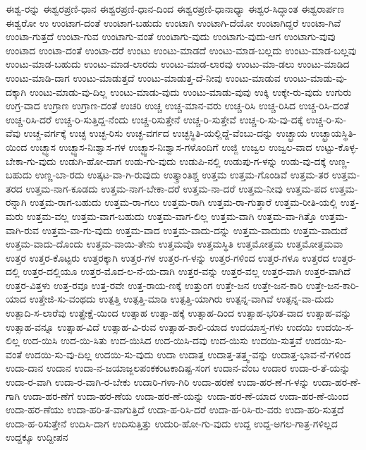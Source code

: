 {ಈಶ್ವ-ರನ್ನು
ಈಶ್ವರಪ್ರಣಿ-ಧಾನ
ಈಶ್ವರಪ್ರಣಿ-ಧಾನ-ದಿಂದ
ಈಶ್ವರಪ್ರಣಿ-ಧಾನಾಧ್ಯಾ
ಈಶ್ವರ-ಸಿದ್ಧಾಂತ
ಈಶ್ವರಾರ್ಪಣ
ಈಶ್ವರೋ
ಉ
ಉಂಟಾಗ-ದಂತೆ
ಉಂಟಾಗ-ಬಹುದು
ಉಂಟಾಗಿ
ಉಂಟಾಗಿ-ದೆಯೋ
ಉಂಟಾಗಿದ್ದರೆ
ಉಂಟಾ-ಗಿವೆ
ಉಂಟಾ-ಗುತ್ತದೆ
ಉಂಟಾ-ಗುವ
ಉಂಟಾಗು-ವಂತೆ
ಉಂಟಾಗು-ವುದು
ಉಂಟಾಗು-ವುದು-ಆಗ
ಉಂಟಾಗು-ವುವು
ಉಂಟಾದ
ಉಂಟಾ-ದಂತೆ
ಉಂಟಾ-ದರೆ
ಉಂಟು
ಉಂಟು-ಮಾಡದೆ
ಉಂಟು-ಮಾಡ-ಬಲ್ಲದು
ಉಂಟು-ಮಾಡ-ಬಲ್ಲವು
ಉಂಟು-ಮಾಡ-ಬಹುದು
ಉಂಟು-ಮಾಡ-ಲಾರದು
ಉಂಟು-ಮಾಡ-ಲಾರವು
ಉಂಟು-ಮಾ-ಡಲು
ಉಂಟು-ಮಾಡಿದ
ಉಂಟು-ಮಾಡಿ-ದಾಗ
ಉಂಟು-ಮಾಡುತ್ತದೆ
ಉಂಟು-ಮಾಡುತ್ತ-ದೆ-ನೀವು
ಉಂಟು-ಮಾಡುವ
ಉಂಟು-ಮಾಡು-ವು-ದಕ್ಕಾಗಿ
ಉಂಟು-ಮಾಡು-ವು-ದಿಲ್ಲ
ಉಂಟು-ಮಾಡು-ವುದು
ಉಂಟು-ಮಾಡು-ವುವು
ಉಕ್ಕಿ
ಉಕ್ಕೇ-ರು-ವುದು
ಉಗುರು
ಉಗ್ರ-ವಾದ
ಉಗ್ರಾಣ
ಉಗ್ರಾಣ-ದಂತೆ
ಉಚರಿ
ಉಚ್ಚ
ಉಚ್ಚ-ಮಾನ-ವರು
ಉಚ್ಚ-ರಿಸಿ
ಉಚ್ಚ-ರಿಸಿದ
ಉಚ್ಚ-ರಿಸಿ-ದಂತೆ
ಉಚ್ಚ-ರಿಸಿ-ದರೆ
ಉಚ್ಚ-ರಿ-ಸುತ್ತಿದ್ದ-ನೆಂದು
ಉಚ್ಚ-ರಿಸುತ್ತೇನೆ
ಉಚ್ಚ-ರಿ-ಸುತ್ತೇವೆ
ಉಚ್ಚ-ರಿ-ಸು-ವು-ದಕ್ಕೆ
ಉಚ್ಚ-ರಿ-ಸು-ವೆವು
ಉಚ್ಚ-ವರ್ಗಕ್ಕೆ
ಉಚ್ಛ
ಉಚ್ಛ-ರಿಸು
ಉಚ್ಛ-ವರ್ಗದ
ಉಚ್ಛಸ್ಥಿತಿ-ಯಲ್ಲಿದ್ದೆ-ವೆಂಬು-ದನ್ನು
ಉಚ್ಛ್ರಾಯ
ಉಚ್ಛ್ರಾಯಸ್ಥಿತಿ-ಯಿಂದ
ಉಚ್ಛ್ವಾಸ
ಉಚ್ಛ್ವಾಸ-ನಿಃಶ್ವಾಸ-ಗಳ
ಉಚ್ಛ್ವಾಸ-ನಿಃಶ್ವಾಸ-ಗಳೊಂದಿಗೆ
ಉಜ್ಜಿ
ಉಜ್ವಲ
ಉಜ್ವಲ-ವಾದ
ಉಟ್ಟು-ಕೊಳ್ಳ-ಬೇಕಾ-ಗು-ವುದು
ಉಡುಗಿ-ಹೋ-ದಾಗ
ಉಡು-ಗು-ವುದು
ಉಡುಪಿ-ನಲ್ಲಿ
ಉಡುಪು-ಗ-ಳನ್ನು
ಉಡು-ವು-ದಕ್ಕೆ
ಉಣ್ಣ-ಬಹುದು
ಉಣ್ಣ-ಬಾ-ರದು
ಉತ್ಕಟ-ವಾ-ಗಿ-ರುವುದು
ಉತ್ಕ್ರಾಂತಿಶ್ಚ
ಉತ್ತಮ
ಉತ್ತಮ-ಗೊಂಡಿವೆ
ಉತ್ತಮ-ತರ
ಉತ್ತಮ-ತರದ
ಉತ್ತಮ-ನಾಗ-ಕೂಡದು
ಉತ್ತಮ-ನಾಗ-ಬೇಕಾ-ದರೆ
ಉತ್ತಮ-ನಾ-ದರೆ
ಉತ್ತಮ-ನೀವು
ಉತ್ತಮ-ಪದ
ಉತ್ತಮ-ರನ್ನಾಗಿ
ಉತ್ತಮ-ರಾಗ-ಬಹುದು
ಉತ್ತಮ-ರಾ-ಗಲು
ಉತ್ತಮ-ರಾಗಿ
ಉತ್ತಮ-ರಾ-ಗುತ್ತಾರೆ
ಉತ್ತಮ-ರೀತಿ-ಯಲ್ಲಿ
ಉತ್ತ-ಮರು
ಉತ್ತಮ-ವಲ್ಲ
ಉತ್ತಮ-ವಾಗ-ಬಹುದು
ಉತ್ತಮ-ವಾಗ-ಲಿಲ್ಲ
ಉತ್ತಮ-ವಾಗಿ
ಉತ್ತಮ-ವಾ-ಗಿತ್ತೊ
ಉತ್ತಮ-ವಾಗಿ-ರುವ
ಉತ್ತಮ-ವಾ-ಗು-ವುದು
ಉತ್ತಮ-ವಾದ
ಉತ್ತಮ-ವಾದು-ದನ್ನು
ಉತ್ತಮ-ವಾದುದು
ಉತ್ತಮ-ವಾದುದೆ
ಉತ್ತಮ-ವಾದು-ದೊಂದು
ಉತ್ತಮ-ವಾಯಿ-ತೇನು
ಉತ್ತಮವೊ
ಉತ್ತಮಸ್ಥಿತಿ
ಉತ್ತಮೋತ್ತಮ
ಉತ್ತಮೋತ್ತಮವಾ
ಉತ್ತರ
ಉತ್ತರ-ಕೊಟ್ಟರು
ಉತ್ತರಕ್ಕಾಗಿ
ಉತ್ತರ-ಗಳ
ಉತ್ತರ-ಗ-ಳನ್ನು
ಉತ್ತರ-ಗಳಿಂದ
ಉತ್ತರ-ಗಳೂ
ಉತ್ತರದ
ಉತ್ತರ-ದಲ್ಲಿ
ಉತ್ತರ-ದಲ್ಲಿಯೂ
ಉತ್ತರ-ಮೊದ-ಲ-ನೆ-ಯ-ದಾಗಿ
ಉತ್ತರ-ವನ್ನು
ಉತ್ತರ-ವಲ್ಲ
ಉತ್ತರ-ವಾಗಿ
ಉತ್ತರ-ವಾಗಿದೆ
ಉತ್ತರ-ವಿತ್ತಳು
ಉತ್ತ-ರವೂ
ಉತ್ತ-ರವೇ
ಉತ್ತ-ರಾಯ-ಣಕ್ಕೆ
ಉತ್ತುಂಗ
ಉತ್ತೇ-ಜನ
ಉತ್ತೇ-ಜನ-ಕಾರಿ
ಉತ್ತೇ-ಜನ-ಕಾರಿ-ಯಾದ
ಉತ್ತೇಜಿ-ಸು-ವಂಥದು
ಉತ್ಪತ್ತಿ
ಉತ್ಪತ್ತಿ-ಮಾಡಿ
ಉತ್ಪತ್ತಿ-ಯಾಗಿರು
ಉತ್ಪನ್ನ-ವಾಗಿವೆ
ಉತ್ಪನ್ನ-ವಾ-ದುದು
ಉತ್ಪಾದಿ-ಸ-ಲಾರೆವು
ಉತ್ಪ್ರೇಕ್ಷೆ-ಯಿಂದ
ಉತ್ಸಾಹ
ಉತ್ಸಾ-ಹಕ್ಕೆ
ಉತ್ಸಾಹ-ದಿಂದ
ಉತ್ಸಾಹ-ಭರಿತ-ವಾದ
ಉತ್ಸಾಹ-ವನ್ನು
ಉತ್ಸಾಹ-ವನ್ನೂ
ಉತ್ಸಾಹ-ವಿದೆ
ಉತ್ಸಾಹ-ವಿ-ರುವ
ಉತ್ಸಾಹ-ಶಾಲಿ-ಯಾದ
ಉದಯಾಸ್ತ-ಗಳು
ಉದಯಿ
ಉದಯಿ-ಸ-ಲಿಲ್ಲ
ಉದ-ಯಿಸಿ
ಉದ-ಯಿ-ಸಿತು
ಉದ-ಯಿಸಿದ
ಉದ-ಯಿಸಿ-ದವು
ಉದ-ಯಿಸು
ಉದಯಿ-ಸುತ್ತವೆ
ಉದಯಿ-ಸು-ವಂತೆ
ಉದಯಿ-ಸು-ವು-ದಿಲ್ಲ
ಉದಯಿ-ಸು-ವುದು
ಉದಾ
ಉದಾತ್ತ
ಉದಾತ್ತ-ತತ್ತ್ವ-ವನ್ನು
ಉದಾತ್ತ-ಭಾವ-ನೆ-ಗಳಿಂದ
ಉದಾ-ದಾನ
ಉದಾನ
ಉದಾ-ನ-ಜಯಾಜ್ಜಲಪಂಕಕಂಟಕಾದಿಷ್ಟ-ಸಂಗ
ಉದಾನ-ವೆಂಬ
ಉದಾರ
ಉದಾ-ರ-ತೆ-ಯನ್ನು
ಉದಾ-ರ-ವಾಗಿ
ಉದಾ-ರ-ವಾಗಿ-ರ-ಬೇಕು
ಉದಾರಿ-ಗಳಾ-ಗಿರಿ
ಉದಾ-ಹರಣೆ
ಉದಾ-ಹರ-ಣೆ-ಗ-ಳನ್ನು
ಉದಾ-ಹರ-ಣೆ-ಗಾಗಿ
ಉದಾ-ಹರ-ಣೆಗೆ
ಉದಾ-ಹರ-ಣೆಯ
ಉದಾ-ಹರ-ಣೆ-ಯನ್ನು
ಉದಾ-ಹರ-ಣೆ-ಯಾದ
ಉದಾ-ಹರ-ಣೆ-ಯಿಂದ
ಉದಾ-ಹರ-ಣೆಯು
ಉದಾ-ಹರಿ-ತ-ವಾಗುತ್ತಿದೆ
ಉದಾ-ಹ-ರಿಸಿ-ದರೆ
ಉದಾ-ಹ-ರಿಸಿ-ರು-ವರು
ಉದಾ-ಹರಿ-ಸುತ್ತದೆ
ಉದಾ-ಹ-ರಿಸುತ್ತೇನೆ
ಉದಿಸಿ-ದಾಗ
ಉದಿಸುತ್ತಿತ್ತು
ಉದುರಿ-ಹೋ-ಗು-ವುದು
ಉದ್ದ
ಉದ್ದ-ಅಗಲ-ಗಾತ್ರ-ಗಳಿಲ್ಲದ
ಉದ್ದಕ್ಕೂ
ಉದ್ದೀಪನ
}

